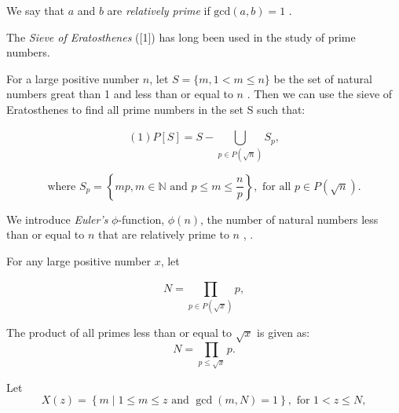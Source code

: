\documentclass{aomart}
\begin{document}
We say that \( a \) and \( b \) are \textit{relatively prime} if \( \text{gcd}(a,b) = 1 \) \cite{2}.


\begin{flushleft}
The  {\textit{Sieve of Eratosthenes} }([1]) has long been used in the study of prime numbers. 
\end{flushleft}


For a large positive number \( n\), let \( S = \{ m,  1<m\leq n\}\) { } be the set of natural numbers great than 1 and less than or equal to \( n\) {.  Then we can use the sieve of Eratosthenes to find all prime numbers in the set }S such that:

\begin{equation}
    (1)                              P\left[S\right] =  S- \bigcup_{p\in P\left(\sqrt{n}\right)}^{} S_{p}  ,
\end{equation}

\begin{equation}
\text{where } S_{p} = \left\{ mp, m \in \mathbb{N} \text{ and } p \leq m \leq \frac{n}{p} \right\} , \text{ for all } p \in P(\sqrt{n}).
\end{equation}


\vspace{1\baselineskip}

We introduce \textit{Euler's} \( \phi \)-function, \( \phi (n) \), the number of natural numbers less than or equal to \( n \) that are relatively prime to \( n \) \cite{2}, \cite{1}.

\vspace{1\baselineskip}

For any large positive number \( x \), let 

\begin{equation}
N = \prod_{p\in P\left(\sqrt{x}\right)}^{}p  ,
\end{equation}

\vspace{1\baselineskip}

The product of all primes less than or equal to \(\sqrt{x}\) is given as:
\begin{equation}
N = \prod_{p \leq \sqrt{x}} p.
\end{equation}
\vspace{1\baselineskip}

Let
\begin{equation}
X(z) = \left\{ m \mid 1 \leq m \leq z \text{ and } \gcd(m,N) = 1 \right\}, \text{ for } 1 < z \leq N,
\end{equation}
\vspace{1\baselineskip}
\end{document}
